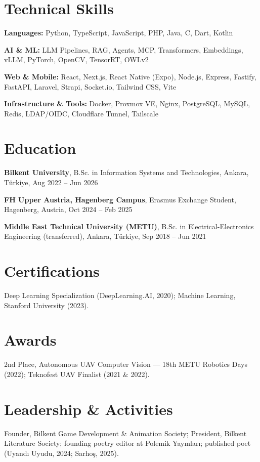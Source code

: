 \documentclass[letterpaper,10pt]{article}
\begin{document}
\section{Technical Skills}
\begin{itemize}[leftmargin=0in, label={}, itemsep=0pt]
\small{\item{\textbf{Languages:} Python, TypeScript, JavaScript, PHP, Java, C, Dart, Kotlin}}
\small{\item{\textbf{AI \& ML:} LLM Pipelines, RAG, Agents, MCP, Transformers, Embeddings, vLLM, PyTorch, OpenCV, TensorRT, OWLv2}}
\small{\item{\textbf{Web \& Mobile:} React, Next.js, React Native (Expo), Node.js, Express, Fastify, FastAPI, Laravel, Strapi, Socket.io, Tailwind CSS, Vite}}
\small{\item{\textbf{Infrastructure \& Tools:} Docker, Proxmox VE, Nginx, PostgreSQL, MySQL, Redis, LDAP/OIDC, Cloudflare Tunnel, Tailscale}}
\end{itemize}
\vspace{-8pt}

\section{Education}
\begin{itemize}[leftmargin=0in, label={}, itemsep=1pt]
\small{\item{\textbf{Bilkent University}, B.Sc. in Information Systems and Technologies, Ankara, Türkiye, Aug 2022 -- Jun 2026}}
\small{\item{\textbf{FH Upper Austria, Hagenberg Campus}, Erasmus Exchange Student, Hagenberg, Austria, Oct 2024 -- Feb 2025}}
\small{\item{\textbf{Middle East Technical University (METU)}, B.Sc. in Electrical-Electronics Engineering (transferred), Ankara, Türkiye, Sep 2018 -- Jun 2021}}
\end{itemize}
\vspace{-8pt}

\section{Certifications}
\small{Deep Learning Specialization (DeepLearning.AI, 2020); Machine Learning, Stanford University (2023).}
\vspace{-6pt}

\section{Awards}
\small{2nd Place, Autonomous UAV Computer Vision — 18th METU Robotics Days (2022); Teknofest UAV Finalist (2021 \& 2022).}
\vspace{-6pt}

\section{Leadership \& Activities}
\small{Founder, Bilkent Game Development \& Animation Society; President, Bilkent Literature Society; founding poetry editor at Polemik Yayınları; published poet (Uyandı Uyudu, 2024; Sarhoş, 2025).}
\vspace{-6pt}
\end{document}
